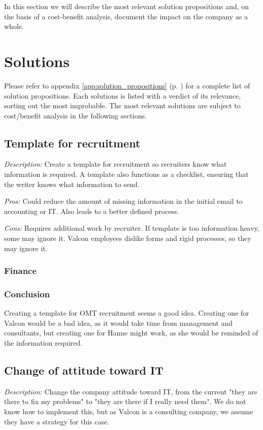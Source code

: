 In this section we will describe the most relevant solution propositions and, on the basis of a cost-benefit analysis, document the impact on the company as a whole.

\section{Solutions}
Please refer to appendix \ref{app:solution_propositions} (p. \pageref{app:solution_propositions}) for a complete list of solution propositions. Each solutions is listed with a verdict of its relevance, sorting out the most improbable.
The most relevant solutions are subject to cost/benefit analysis in the following sections. 

\subsection{Template for recruitment}
\emph{Description:} Create a template for recruitment so recruiters know what information is required. A template also functions as a checklist, ensuring that the writer knows what information to send.

\emph{Pros:} Could reduce the amount of missing information in the initial email to accounting or IT. 
Also leads to a better defined process.

\emph{Cons:} Requires additional work by recruiter. 
If template is too information heavy, some may ignore it.
Valcon employees dislike forms and rigid processes, so they may ignore it.

\subsubsection{Finance}

\subsubsection{Conclusion} Creating a template for OMT recruitment seems a good idea.
Creating one for Valcon would be a bad idea, as it would take time from management and consultants, but creating one for Hanne might work, as she would be reminded of the information required.

\subsection{Change of attitude toward IT}
\emph{Description:} Change the company attitude toward IT, from the current "they are there to fix my problems" to "they are there if I really need them".
We do not know how to implement this, but as Valcon is a consulting company, we assume they have a strategy for this case.

